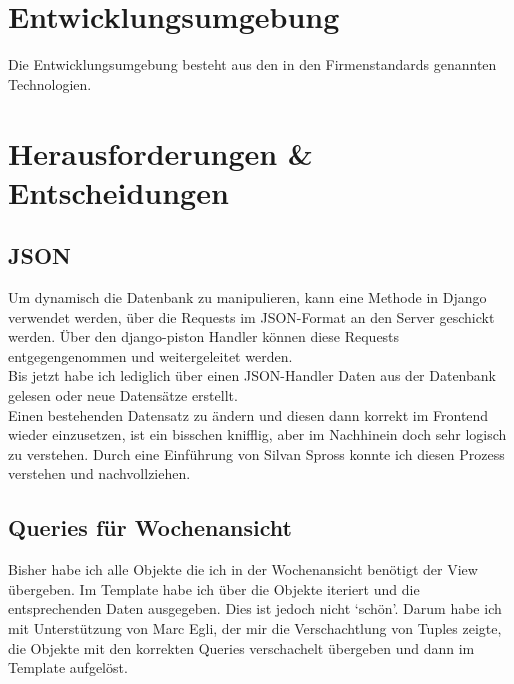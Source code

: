 \section{Entwicklungsumgebung}
Die Entwicklungsumgebung besteht aus den in den Firmenstandards genannten Technologien.
\section{Herausforderungen \& Entscheidungen}
\subsection{JSON}
Um dynamisch die Datenbank zu manipulieren, kann eine Methode in Django verwendet werden, über die Requests im JSON-Format an den Server geschickt werden. 
Über den django-piston Handler können diese Requests entgegengenommen und weitergeleitet werden.\\
Bis jetzt habe ich lediglich über einen JSON-Handler Daten aus der Datenbank gelesen oder neue Datensätze erstellt.\\
Einen bestehenden Datensatz zu ändern und diesen dann korrekt im Frontend wieder einzusetzen, ist ein bisschen knifflig, aber im Nachhinein doch sehr logisch zu verstehen.
Durch eine Einführung von Silvan Spross konnte ich diesen Prozess verstehen und nachvollziehen.
\subsection{Queries für Wochenansicht}
Bisher habe ich alle Objekte die ich in der Wochenansicht benötigt der View übergeben.
Im Template habe ich über die Objekte iteriert und die entsprechenden Daten ausgegeben. Dies ist jedoch nicht `schön'. 
Darum habe ich mit Unterstützung von Marc Egli, der mir die Verschachtlung von Tuples zeigte, die Objekte mit den korrekten Queries verschachelt übergeben und dann im Template aufgelöst.
